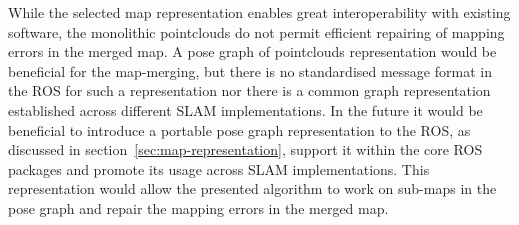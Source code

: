 While the selected map representation enables great interoperability with existing software, the monolithic pointclouds do not permit efficient repairing of mapping errors in the merged map. A pose graph of pointclouds representation would be beneficial for the map-merging, but there is no standardised message format in the \gls{ROS} for such a representation nor there is a common graph representation established across different \gls{SLAM} implementations. In the future it would be beneficial to introduce a portable pose graph representation to the \gls{ROS}, as discussed in section~\ref{sec:map-representation}, support it within the core \gls{ROS} packages and promote its usage across \gls{SLAM} implementations. This representation would allow the presented algorithm to work on sub-maps in the pose graph and repair the mapping errors in the merged map.

